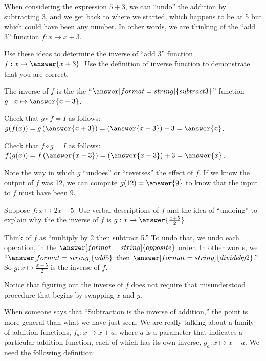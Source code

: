 \documentclass{ximera}
\begin{document}
When considering the expression $5+3$, we can ``undo'' the addition by subtracting 3, and we get back to where we started, which happens to be at 5 but which could have been any number.  In other words, we are thinking of the ``add 3'' function $f:x\mapsto x+3$.  
\begin{question}
Use these ideas to determine the inverse of ``add 3'' function $f:x\mapsto \answer{x+3}$. Use the definition of inverse function to demonstrate that you are correct.  
\begin{solution}
The inverse of $f$ is the the ``$\answer[format=string]{subtract 3}$'' function $g:x\mapsto \answer{x-3}$.  

Check that $g\circ f=I$ as follows:  $g(f(x))=g\left(\answer{x+3}\right)=\left(\answer{x+3}\right)-3=\answer{x}$.  

Check that $f\circ g = I$ as follows:  $f(g(x))=f\left(\answer{x-3}\right)=\left(\answer{x-3}\right)+3=\answer{x}$.  
\end{solution}
\end{question}

\begin{question}
Note the way in which $g$ ``undoes'' or ``reverses'' the effect of $f$.  If we know the output of $f$ was 12, we can compute $g(12)=\answer{9}$ to know that the input to $f$ must have been 9.  
\end{question}

\begin{question}
Suppose $f:x\mapsto 2x-5$.  Use verbal descriptions of $f$ and the idea of ``undoing'' to explain why the the inverse of $f$ is $g:x\mapsto \answer{\frac{x+5}{2}}$.  
\begin{solution}
Think of $f$ as ``multiply by 2 then subtract 5.'' To undo that, we undo each operation, in the 
$\answer[format=string]{opposite}$ order.  In other words, we 
``$\answer[format=string]{add 5}$ then $\answer[format=string]{divide by 2}$.''  So $g:x\mapsto \frac{x+5}{2}$ is the inverse of $f$.  
\end{solution}
\end{question}

\begin{remark}
Notice that figuring out the inverse of $f$ does not require that misunderstood procedure that begins by swapping $x$ and $y$.  
\end{remark}

When someone says that ``Subtraction is the inverse of addition,'' the point is more general than what we have just seen.  We are really talking about a family of addition functions, $f_a:x\mapsto x+a$, where $a$ is a parameter that indicates a particular addition function, each of which has its own inverse, $g_a:x\mapsto x-a$.  We need the following definition:  
\end{document}
